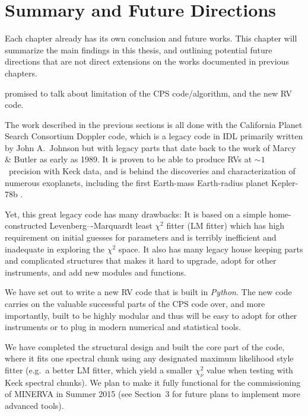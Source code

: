 \chapter{Summary and Future Directions}\label{chap:conclusion}

Each chapter already has its own conclusion and future works. This
chapter will summarize the main findings in this thesis, and outlining
potential future directions that are not direct extensions on the
works documented in previous chapters.

promised to talk about limitation of the CPS code/algorithm, and the
new RV code.

The work described in the previous sections is all done with the
California Planet Search Consortium Doppler code, which is a legacy
code in IDL primarily written by John A.\ Johnson but with legacy
parts that date back to the work of Marcy \& Butler as early as
1989. It is proven to be able to produce RVs at $\sim 1$
\mps\ precision with Keck data, and is behind the discoveries and
characterization of numerous exoplanets, including the first
Earth-mass Earth-radius planet Kepler-78b \citep{howard2013,pepe2013}.

Yet, this great legacy code has many drawbacks: It is based on a
simple home-constructed Levenberg–-Marquardt least $\chi^2$ fitter
(LM fitter) which has high requirement on initial guesses for
parameters and is terribly inefficient and inadequate in exploring the
$\chi^2$ space. It also has many legacy house keeping parts and
complicated structures that makes it hard to upgrade, adopt for other
instruments, and add new modules and functions.

We have set out to write a new RV code that is built in {\it Python}.
The new code carries on the valuable successful parts of the CPS code
over, and more importantly, built to be highly modular and thus will
be easy to adopt for other instruments or to plug in modern
numerical and statistical tools.

We have completed the structural design and built the core part of the
code, where it fits one spectral chunk using any designated maximum
likelihood style fitter (e.g.\ a better LM fitter, which yield a
smaller $\chi^2_\nu$ value when testing with Keck spectral chunks). We
plan to make it fully functional for the commissioning of MINERVA in
Summer 2015 (see Section~3 for future plans to implement more
advanced tools).


